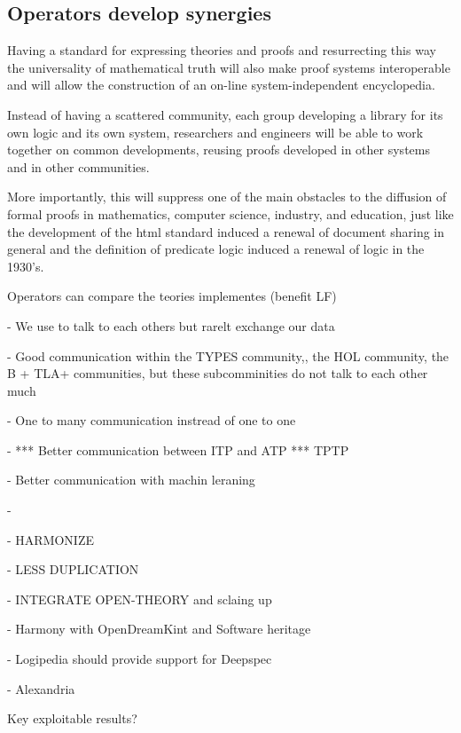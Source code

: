   
\subsection{Operators develop synergies}

Having a standard for expressing theories and proofs and resurrecting
this way the universality of mathematical truth will also make proof
systems interoperable and will allow the construction of an on-line
system-independent encyclopedia.

Instead of having a scattered community, each group developing a
library for its own logic and its own system, researchers and
engineers will be able to work together on common developments,
reusing proofs developed in other systems and in other communities.

More importantly, this will suppress one of the main obstacles to the
diffusion of formal proofs in mathematics, computer science, industry,
and education, just like the development of the html standard induced
a renewal of document sharing in general and the definition of
predicate logic induced a renewal of logic in the 1930's.

Operators can compare the teories implementes (benefit LF)

- We use to talk to each others but rarelt exchange our data

- Good communication within the TYPES community,, the HOL community,
the B + TLA+ communities, but these subcomminities do not talk to each
other much

- One to many communication instread of one to one

- *** Better communication between ITP and ATP *** TPTP

- Better communication with machin leraning





- 

- HARMONIZE

- LESS DUPLICATION

- INTEGRATE OPEN-THEORY and sclaing up

- Harmony with OpenDreamKint and Software heritage

- Logipedia should provide support for Deepspec

- Alexandria

{\color{red} Key exploitable results?}


